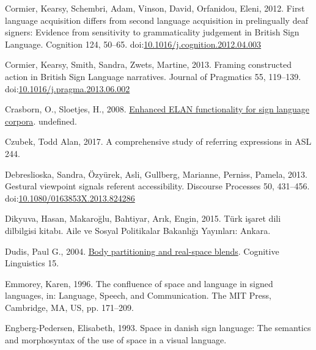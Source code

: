 \documentclass[]{elsarticle} %
\newlength{\cslhangindent}
\newenvironment{CSLReferences}[2] %
 {%
  \setlength{\parindent}{0pt}
  \ifodd #1 \everypar{\setlength{\hangindent}{\cslhangindent}}\ignorespaces\fi
  \ifnum #2 > 0
  \setlength{\parskip}{#2\baselineskip}
  \fi
 }%
 {}
\begin{document}
\begin{CSLReferences}{1}{0}
\leavevmode{}%
Cormier, Kearsy, Schembri, Adam, Vinson, David, Orfanidou, Eleni, 2012.
First language acquisition differs from second language acquisition in
prelingually deaf signers: Evidence from sensitivity to grammaticality
judgement in British Sign Language. Cognition 124, 50--65.
doi:\href{https://doi.org/10.1016/j.cognition.2012.04.003}{10.1016/j.cognition.2012.04.003}

\leavevmode{}%
Cormier, Kearsy, Smith, Sandra, Zwets, Martine, 2013. Framing
constructed action in British Sign Language narratives. Journal of
Pragmatics 55, 119--139.
doi:\href{https://doi.org/10.1016/j.pragma.2013.06.002}{10.1016/j.pragma.2013.06.002}

\leavevmode{}%
Crasborn, O., Sloetjes, H., 2008.
\href{https://www.semanticscholar.org/paper/Enhanced-ELAN-functionality-for-sign-language-Crasborn-Sloetjes/e1623ec6b2bc3532129a3682eb263cc2e7d5389c}{Enhanced
ELAN functionality for sign language corpora}. undefined.

\leavevmode{}%
Czubek, Todd Alan, 2017. A comprehensive study of referring expressions
in ASL 244.

\leavevmode{}%
Debreslioska, Sandra, Özyürek, Asli, Gullberg, Marianne, Perniss,
Pamela, 2013. Gestural viewpoint signals referent accessibility.
Discourse Processes 50, 431--456.
doi:\href{https://doi.org/10.1080/0163853X.2013.824286}{10.1080/0163853X.2013.824286}

\leavevmode{}%
Dikyuva, Hasan, Makaroğlu, Bahtiyar, Arık, Engin, 2015. Türk i{ş}aret
dili dilbilgisi kitab{ı}. Aile ve Sosyal Politikalar Bakanl{ı}{ğ}{ı}
Yay{ı}nlar{ı}: Ankara.

\leavevmode{}%
Dudis, Paul G., 2004.
\href{https://www.degruyter.com/view/j/cogl.2004.15.issue-2/cogl.2004.009/cogl.2004.009.xml}{Body
partitioning and real-space blends}. Cognitive Linguistics 15.

\leavevmode{}%
Emmorey, Karen, 1996. The confluence of space and language in signed
languages, in: Language, Speech, and Communication. The MIT Press,
Cambridge, MA, US, pp. 171--209.

\leavevmode{}%
Engberg-Pedersen, Elisabeth, 1993. Space in danish sign language: The
semantics and morphosyntax of the use of space in a visual language.


\end{CSLReferences}
\end{document}
